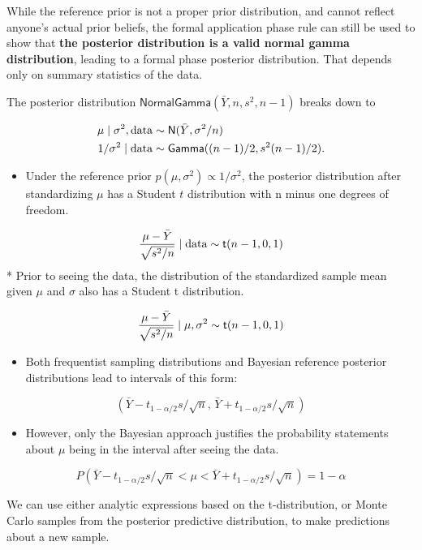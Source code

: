 \documentclass[]{book}
\providecommand{\tightlist}{%
  \setlength{\itemsep}{0pt}\setlength{\parskip}{0pt}}
\theoremstyle{definition}
\theoremstyle{definition}
\theoremstyle{definition}
\theoremstyle{remark}
\begin{document}
While the reference prior is not a proper prior distribution, and cannot
reflect anyone's actual prior beliefs, the formal application phase rule
can still be used to show that \textbf{the posterior distribution is a
valid normal gamma distribution}, leading to a formal phase posterior
distribution. That depends only on summary statistics of the data.

The posterior distribution
\(\textsf{NormalGamma}(\bar{Y}, n, s^2, n-1)\) breaks down to

\[\begin{aligned}
\mu \mid \sigma^2, \text{data} & \sim \textsf{N}(\bar{Y}, \sigma^2/n) \\
1/\sigma^2  \mid \text{data} & \sim \textsf{Gamma}((n-1)/2, s^2(n - 1)/2).
\end{aligned}\]

\begin{itemize}
\tightlist
\item
  Under the reference prior \(p(\mu, \sigma^2) \propto 1/\sigma^2\), the
  posterior distribution after standardizing \(\mu\) has a Student \(t\)
  distribution with n minus one degrees of freedom.
\end{itemize}

\[\frac{\mu - \bar{Y}}{\sqrt{s^2/n}} \mid \text{data} \sim  \textsf{t}(n-1, 0, 1)\] *
Prior to seeing the data, the distribution of the standardized sample
mean given \(\mu\) and \(\sigma\) also has a Student t distribution.

\[\frac{\mu - \bar{Y}}{\sqrt{s^2/n}} \mid \mu, \sigma^2 \sim  \textsf{t}(n-1, 0, 1) \]

\begin{itemize}
\tightlist
\item
  Both frequentist sampling distributions and Bayesian reference
  posterior distributions lead to intervals of this form:
\end{itemize}

\[(\bar{Y} - t_{1 - \alpha/2} s/\sqrt{n}, \, \bar{Y} + t_{1 - \alpha/2} s/\sqrt{n})\]

\begin{itemize}
\tightlist
\item
  However, only the Bayesian approach justifies the probability
  statements about \(\mu\) being in the interval after seeing the data.
\end{itemize}

\[P(\bar{Y} - t_{1 - \alpha/2} s/\sqrt{n} < \mu <  \bar{Y} + t_{1 - \alpha/2} s/\sqrt{n}) = 1 - \alpha\]

We can use either analytic expressions based on the t-distribution, or
Monte Carlo samples from the posterior predictive distribution, to make
predictions about a new sample.
\end{document}
